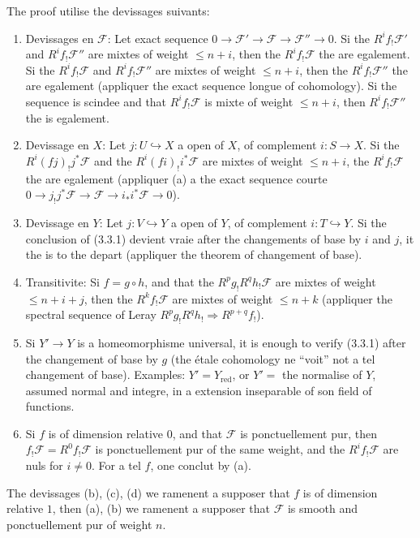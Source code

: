 \documentclass[12pt,a4paper]{article}
\theoremstyle{plain}
\theoremstyle{definition}
\theoremstyle{remark}
\begin{document}
The proof utilise the devissages suivants:
\begin{enumerate}[label=\alph*)]
\item Devissages en $\mathscr{F}$: Let exact sequence $0 \to \mathscr{F}' \to \mathscr{F} \to \mathscr{F}'' \to 0$. Si the $R^i f_! \mathscr{F}'$ and $R^i f_! \mathscr{F}''$ are mixtes of weight $\leq n + i$, then the $R^i f_! \mathscr{F}$ the are egalement. Si the $R^i f_! \mathscr{F}$ and $R^i f_! \mathscr{F}''$ are mixtes of weight $\leq n + i$, then the $R^i f_! \mathscr{F}''$ the are egalement (appliquer the exact sequence longue of cohomology). Si the sequence is scindee and that $R^i f_! \mathscr{F}$ is mixte of weight $\leq n + i$, then $R^i f_! \mathscr{F}''$ the is egalement.
\item Devissage en $X$: Let $j : U \hookrightarrow X$ a open of $X$, of complement $i : S \to X$. Si the $R^i (fj)_! j^*\mathscr{F}$ and the $R^i (fi)_! i^*\mathscr{F}$ are mixtes of weight $\leq n + i$, the $R^i f_! \mathscr{F}$ the are egalement (appliquer (a) a the exact sequence courte $0 \to j_!j^*\mathscr{F} \to \mathscr{F} \to i_*i^*\mathscr{F} \to 0$).
\item Devissage en $Y$: Let $j : V \hookrightarrow Y$ a open of $Y$, of complement $i : T \hookrightarrow Y$. Si the conclusion of (3.3.1) devient vraie after the changements of base by $i$ and $j$, it the is to the depart (appliquer the theorem of changement of base).
\item Transitivite: Si $f = g \circ h$, and that the $R^p g_! R^q h_! \mathscr{F}$ are mixtes of weight $\leq n + i + j$, then the $R^k f_! \mathscr{F}$ are mixtes of weight $\leq n + k$ (appliquer the spectral sequence of Leray $R^p g_! R^q h_! \Rightarrow R^{p+q} f_!$).
\item Si $Y' \to Y$ is a homeomorphisme universal, it is enough to verify (3.3.1) after the changement of base by $g$ (the étale cohomology ne ``voit'' not a tel changement of base). Examples: $Y' = Y_{\text{red}}$, or $Y' =$ the normalise of $Y$, assumed normal and integre, in a extension inseparable of son field of functions.
\item Si $f$ is of dimension relative $0$, and that $\mathscr{F}$ is ponctuellement pur, then $f_! \mathscr{F} = R^0 f_! \mathscr{F}$ is ponctuellement pur of the same weight, and the $R^i f_! \mathscr{F}$ are nuls for $i \neq 0$. For a tel $f$, one conclut by (a).
\end{enumerate}

The devissages (b), (c), (d) we ramenent a supposer that $f$ is of dimension relative $1$, then (a), (b) we ramenent a supposer that $\mathscr{F}$ is smooth and ponctuellement pur of weight $n$.
\end{document}
